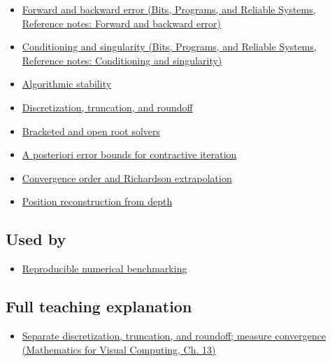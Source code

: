 \begin{itemize}
\tightlist
\item
  \href{../01-Bits-Programs-and-Reliable-Systems/main.pdf\#nameddest=appendix-a7fbaf6d1b1c}{Forward and backward error (Bits, Programs, and Reliable Systems, Reference notes: Forward and backward error)}
\item
  \href{../01-Bits-Programs-and-Reliable-Systems/main.pdf\#nameddest=appendix-8f6a01f284a7}{Conditioning and singularity (Bits, Programs, and Reliable Systems, Reference notes: Conditioning and singularity)}
\item
  \hyperref[appendix-aa2bf0d79639]{Algorithmic stability}
\item
  \hyperref[appendix-6b0648b2b8e8]{Discretization, truncation, and roundoff}
\item
  \hyperref[appendix-f63eb850796d]{Bracketed and open root solvers}
\item
  \hyperref[appendix-d83b0ad1be7f]{A posteriori error bounds for contractive iteration}
\item
  \hyperref[appendix-aca80b6bf17a]{Convergence order and Richardson extrapolation}
\item
  \hyperref[appendix-2cbf2968e866]{Position reconstruction from depth}
\end{itemize}

\subsection{Used by}\label{appendix-31b8c295e05f-used-by}

\hypertarget{appendix-31b8c295e05f-used-by}{}

\begin{itemize}
\tightlist
\item
  \hyperref[appendix-b9db93e28371]{Reproducible numerical benchmarking}
\end{itemize}

\subsection{Full teaching explanation}\label{appendix-31b8c295e05f-full-teaching-explanation}

\hypertarget{appendix-31b8c295e05f-full-teaching-explanation}{}

\begin{itemize}
\tightlist
\item
  \href{../02-Mathematics-for-Visual-Computing/main.pdf\#nameddest=02-foundations-ii-ch029-separate-discretization-truncation-and-roundoff-measure-convergence}{Separate discretization, truncation, and roundoff; measure convergence (Mathematics for Visual Computing, Ch. 13)}
\end{itemize}

